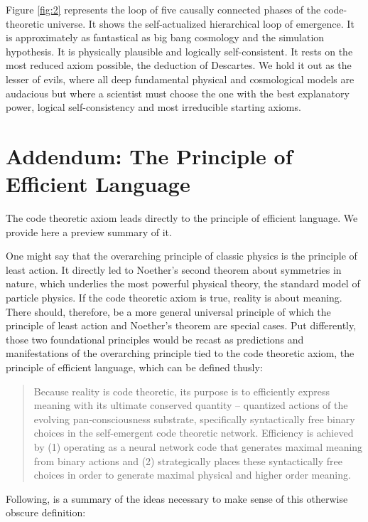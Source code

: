 \documentclass[submission,copyright,creativecommons]{eptcs}
\begin{document}
Figure \ref{fig:2} represents the loop of five causally connected phases of the code-theoretic universe. It shows the self-actualized hierarchical loop of emergence. It is approximately as fantastical as big bang cosmology and the simulation hypothesis\cite{bostrom2009simulation}. It is physically plausible and logically self-consistent. It rests on the most reduced axiom possible, the deduction of Descartes. We hold it out as the lesser of evils, where all deep fundamental physical and cosmological models are audacious but where a scientist must choose the one with the best explanatory power, logical self-consistency and most irreducible starting axioms.

\newpage
\section{Addendum: The Principle of Efficient Language}
\label{sec:13}

The code theoretic axiom leads directly to the principle of efficient language. We provide here a preview summary of it.

One might say that the overarching principle of classic physics is the principle of least action. It directly led to Noether’s second theorem about symmetries in nature, which underlies the most powerful physical theory, the standard model of particle physics. If the code theoretic axiom is true, reality is about meaning. There should, therefore, be a more general universal principle of which the principle of least action and Noether’s theorem are special cases. Put differently, those two foundational principles would be recast as predictions and manifestations of the overarching principle tied to the code theoretic axiom, the principle of efficient language, which can be defined thusly:

\begin{quote}
Because reality is code theoretic, its purpose is to efficiently express meaning with its ultimate conserved quantity -- quantized actions of the evolving pan-consciousness substrate, specifically syntactically free binary choices in the self-emergent code theoretic network. Efficiency is achieved by (1) operating as a neural network code that generates maximal meaning from binary actions and (2) strategically places these syntactically free choices in order to generate maximal physical and higher order meaning.
\source{}
\end{quote}

Following, is a summary of the ideas necessary to make sense of this otherwise obscure definition:
\end{document}
